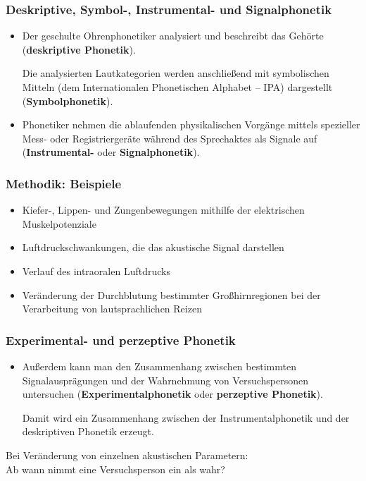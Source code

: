 \begin{frame}
\frametitle{Deskriptive, Symbol-, Instrumental- und Signalphonetik}

	\begin{itemize}
		\item Der geschulte Ohrenphonetiker analysiert und beschreibt das Gehörte
                  (\textbf{deskriptive Phonetik}).

                  Die analysierten Lautkategorien werden anschließend mit symbolischen Mitteln (dem Internationalen Phonetischen Alphabet -- IPA) dargestellt (\textbf{Symbolphonetik}).

		\item Phonetiker nehmen die ablaufenden physikalischen Vorgänge mittels spezieller Mess- oder Registriergeräte während des Sprechaktes als Signale auf (\textbf{Instrumental-} oder \textbf{Signalphonetik}).
	\end{itemize}
	
\end{frame}


\begin{frame}
\frametitle{Methodik: Beispiele}

	\begin{itemize}
\item Kiefer-, Lippen- und Zungenbewegungen mithilfe der elektrischen Muskelpotenziale
\item Luftdruckschwankungen, die das akustische Signal darstellen
\item Verlauf des intraoralen Luftdrucks
\item Veränderung der Durchblutung bestimmter Großhirnregionen bei der Verarbeitung von lautsprachlichen Reizen
	\end{itemize}
	
\end{frame}


\begin{frame}
\frametitle{Experimental- und perzeptive Phonetik}

	\begin{itemize}
		\item Außerdem kann man den Zusammenhang zwischen bestimmten Signalausprägungen und
                  der Wahrnehmung von Versuchspersonen untersuchen (\textbf{Experimentalphonetik}
                  oder \textbf{perzeptive Phonetik}).

                  Damit wird ein Zusammenhang zwischen der Instrumentalphonetik und der deskriptiven Phonetik erzeugt.
	\end{itemize}
	
	\ea	Bei Veränderung von einzelnen akustischen Parametern:\\
	Ab wann nimmt eine Versuchsperson ein \textipa{[ da ]} als \textipa{[ ta ]} wahr?
	\z 
	
\end{frame}


